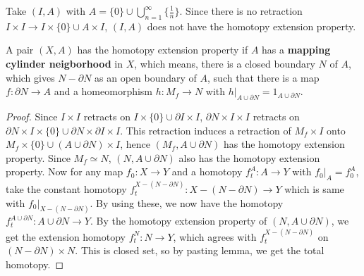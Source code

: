\begin{exmp} Take $(I,A)$ with $A=\{0\}\cup\bigcup_{n=1}^{\infty}\{\frac{1}{n}\}$. Since there is no retraction $I\times I \rightarrow I\times \{0\} \cup A\times I$, $(I,A)$ does not have the homotopy extension property.
\end{exmp}
\begin{prop} A pair $(X,A)$ has the homotopy extension property if $A$ has a \textbf{mapping cylinder neigborhood} in $X$, which means, there is a closed boundary $N$ of $A$, which gives $N-\partial N$ as an open boundary of $A$, such that there is a map $f:\partial N\rightarrow A$ and a homeomorphism $h:M_f\rightarrow N$ with $h|_{A\cup \partial N}=1_{A\cup \partial N}$.
\end{prop}
\begin{proof} Since $I\times I$ retracts on $I\times \{0\}\cup \partial I\times I$, $\partial N\times I\times I$ retracts on $\partial N\times I\times\{0\}\cup \partial N\times \partial I\times I$. This retraction induces a retraction of $M_f\times I$ onto $M_f\times \{0\}\cup(A\cup \partial N)\times I$, hence $(M_f,A\cup \partial N)$ has the homotopy extension property. Since $M_f\simeq N$, $(N,A\cup \partial N)$ also has the homotopy extension property. Now for any map $f_0:X\rightarrow Y$ and a homotopy $f_t^A:A\rightarrow Y$ with $f_0|_A = f_0^A$, take the constant homotopy $f_t^{X-(N-\partial N)}:X-(N-\partial N)\rightarrow Y$ which is same with $f_0|_{X-(N-\partial N)}$. By using these, we now have the homotopy $f_t^{A\cup \partial N}:A\cup \partial N\rightarrow Y$. By the homotopy extension property of $(N,A\cup \partial N)$, we get the extension homotopy $f_t^{N}:N\rightarrow Y$, which agrees with $f_t^{X-(N-\partial N)}$ on $(N-\partial N)\times N$. This is closed set, so by pasting lemma, we get the total homotopy.
\end{proof}
